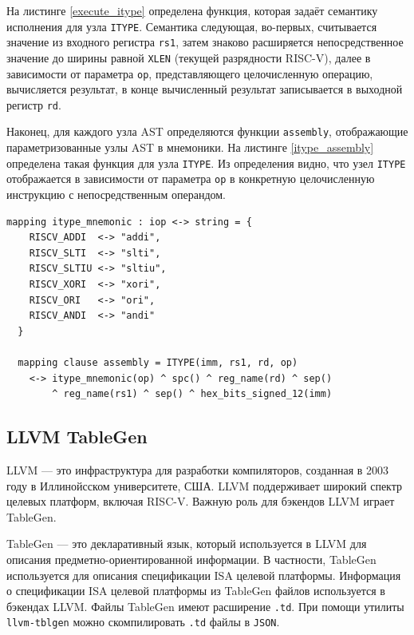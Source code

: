 На листинге \ref{execute_itype} определена функция, которая задаёт семантику исполнения для узла \texttt{ITYPE}.
Семантика следующая, во-первых, считывается значение из входного регистра \texttt{rs1}, затем знаково расширяется непосредственное значение до ширины равной \texttt{XLEN} (текущей разрядности RISC-V), далее в зависимости от параметра \texttt{op}, представляющего целочисленную операцию, вычисляется результат, в конце вычисленный результат записывается в выходной регистр \texttt{rd}.

Наконец, для каждого узла AST определяются функции \texttt{assembly}, отображающие параметризованные узлы AST в мнемоники.
На листинге \ref{itype_assembly} определена такая функция для узла \texttt{ITYPE}.
Из определения видно, что узел \texttt{ITYPE} отображается в зависимости от параметра \texttt{op} в конкретную целочисленную инструкцию с непосредственным операндом.

\begin{lstlisting}[caption={Пример определения функции отображения параметризованного узла AST в мнемонику в sail-riscv}, language=sail, frame=single, label=itype_assembly]
  mapping itype_mnemonic : iop <-> string = {
    RISCV_ADDI  <-> "addi",
    RISCV_SLTI  <-> "slti",
    RISCV_SLTIU <-> "sltiu",
    RISCV_XORI  <-> "xori",
    RISCV_ORI   <-> "ori",
    RISCV_ANDI  <-> "andi"
  }

  mapping clause assembly = ITYPE(imm, rs1, rd, op)
    <-> itype_mnemonic(op) ^ spc() ^ reg_name(rd) ^ sep()
        ^ reg_name(rs1) ^ sep() ^ hex_bits_signed_12(imm)
\end{lstlisting}

\subsection{LLVM TableGen}

LLVM \cite{lattner2004llvm} --- это инфраструктура для разработки компиляторов, созданная в 2003 году в Иллинойсском университете, США.
LLVM поддерживает широкий спектр целевых платформ, включая RISC-V.
Важную роль для бэкендов LLVM играет TableGen.

TableGen --- это декларативный язык, который используется в LLVM для описания предметно-ориентированной информации.
В частности, TableGen используется для описания спецификации ISA целевой платформы.
Информация о спецификации ISA целевой платформы из TableGen файлов используется в бэкендах LLVM.
Файлы TableGen имеют расширение \texttt{.td}.
При помощи утилиты \texttt{llvm-tblgen} можно скомпилировать \texttt{.td} файлы в \texttt{JSON}.

